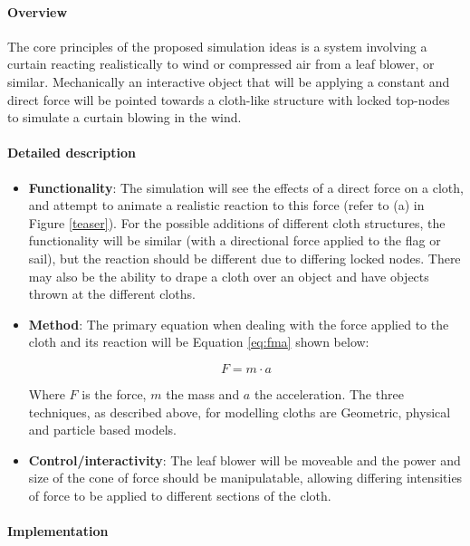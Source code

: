 \documentclass[conference,backref=page]{acmsiggraph}
\begin{document}
	\paragraph{Overview}
	The core principles of the proposed simulation ideas is a system involving a curtain reacting realistically to wind or compressed air from a leaf blower, or similar. Mechanically an interactive object that will be applying a constant and direct force will be pointed towards a cloth-like structure with locked top-nodes to simulate a curtain blowing in the wind.
	
	\paragraph{Detailed description}
	\begin{itemize}
		\item {\bf Functionality}: The simulation will see the effects of a direct force on a cloth, and attempt to animate a realistic reaction to this force (refer to (a) in Figure \ref{teaser}). For the possible additions of different cloth structures, the functionality will be similar (with a directional force applied to the flag or sail), but the reaction should be different due to differing locked nodes. There may also be the ability to drape a cloth over an object and have objects thrown at the different cloths.
		\item {\bf Method}: The primary equation when dealing with the force applied to the cloth and its reaction will be Equation \ref{eq:fma} shown below:
		
		\begin{equation} \label{eq:fma}
			F = m\cdot a
		\end{equation}
		
		Where $F$ is the force, $m$ the mass and $a$ the acceleration. The three techniques, as described above, for modelling cloths are Geometric, physical and particle based models.
		
		\item {\bf Control/interactivity}: The leaf blower will be moveable and the power and size of the cone of force should be manipulatable, allowing differing intensities of force to be applied to different sections of the cloth.
	\end{itemize}
	
	\paragraph{Implementation}
	
\end{document}
